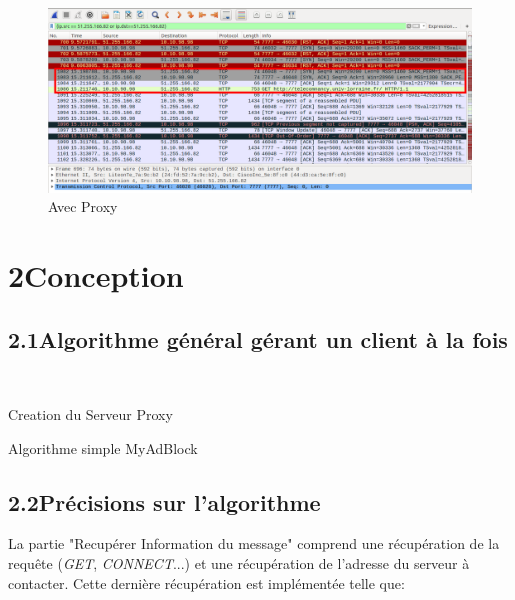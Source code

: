 \documentclass[12pt, a4paper]{report}
\begin{document}
\begin{figure}[h]
   \caption{\label{étiquette} Avec Proxy}
   \includegraphics[scale=0.35]{../images/Proxy.png}
\end{figure}




\chapter*{2\hspace{1cm}Conception}

\section*{\hspace{0.6cm}2.1\hspace{0.6cm}Algorithme général gérant un client à la fois}

\begin{algorithm}[H]
 \
 
 Creation du Serveur Proxy\;\
 
 \caption{Algorithme simple MyAdBlock}
\end{algorithm}

\newpage

\section*{\hspace{0.6cm}2.2\hspace{0.6cm}Précisions sur l'algorithme}
\hspace{1cm}La partie "Recupérer Information du message" comprend une récupération de la requête (\textit{GET}, \textit{CONNECT}...) et une récupération de l'adresse du serveur à contacter. Cette dernière récupération est implémentée telle que:\\
\end{document}
